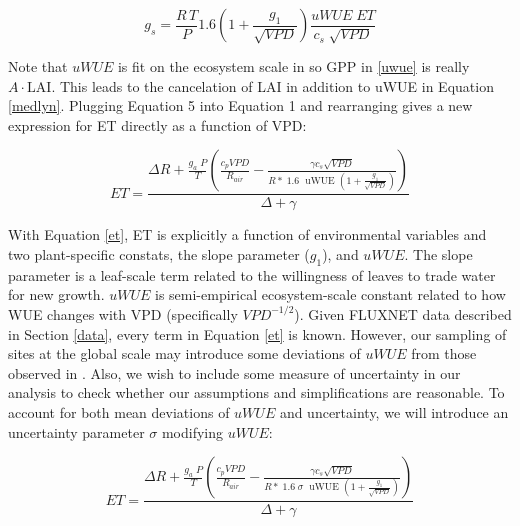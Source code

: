 \documentclass[draft,linenumbers]{agujournal}
\begin{document}
\begin{linenomath*}
  \begin{equation}
  g_s = \frac{R \, T}{P} 1.6 \left(1 + \frac{g_1}{\sqrt{VPD}}\right) \frac{uWUE \; ET}{c_s \; \sqrt{VPD}}
  \end{equation}
\end{linenomath*}

Note that $uWUE$ is fit on the ecosystem scale in \citet{Zhou_2015} so GPP in \ref{uwue} is really $A\cdot \text{LAI}$. This leads to the cancelation of LAI in addition to uWUE in Equation \ref{medlyn}. Plugging Equation 5 into Equation 1 and rearranging gives a new expression for ET directly as a function of VPD:

\begin{linenomath*}
  \begin{equation}
    ET = \frac{\Delta R + \frac{g_a\; P}{T} \left( \frac{ c_p VPD}{R_{air}} -  \frac{\gamma c_s \sqrt{VPD} }{ R* \; 1.6\; \text{ uWUE } (1 + \frac{g_1}{\sqrt{VPD}})} \right) }{ \Delta + \gamma}
    \label{et}
  \end{equation}
\end{linenomath*}

With Equation \ref{et}, ET is explicitly a function of environmental variables and two plant-specific constats, the slope parameter ($g_1$), and $uWUE$. The slope parameter is a leaf-scale term related to the willingness of leaves to trade water for new growth. $uWUE$ is semi-empirical ecosystem-scale constant related to how WUE changes with VPD (specifically $VPD^{-1/2}$). Given FLUXNET data described in Section \ref{data}, every term in Equation \ref{et} is known. However, our sampling of sites at the global scale may introduce some deviations of $uWUE$ from those observed in \citet{Zhou_2015}. Also, we wish to include some measure of uncertainty in our analysis to check whether our assumptions and simplifications are reasonable. To account for both mean deviations of $uWUE$ and uncertainty, we will introduce an uncertainty parameter $\sigma$ modifying $uWUE$:

\begin{linenomath*}
  \begin{equation}
    ET = \frac{\Delta R + \frac{g_a\; P}{T} \left( \frac{ c_p VPD}{R_{air}} -  \frac{\gamma c_s \sqrt{VPD} }{ R* \; 1.6\; \sigma \; \text{ uWUE } (1 + \frac{g_1}{\sqrt{VPD}})} \right) }{ \Delta + \gamma}
    \label{et_sigma}
  \end{equation}
\end{linenomath*}
\end{document}
